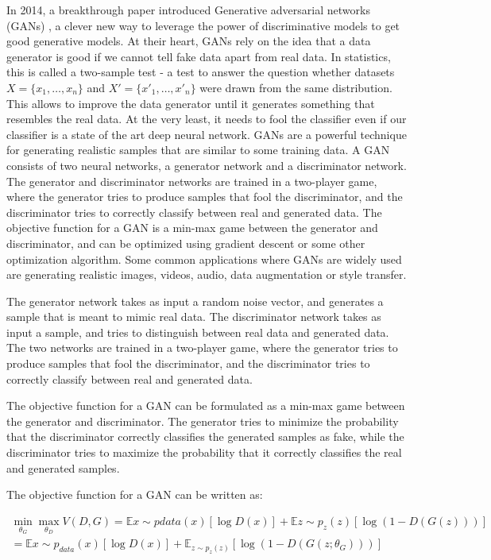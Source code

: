 In 2014, a breakthrough paper introduced Generative adversarial networks (GANs) \cite{goodfellow2020generative}, a clever new way to leverage the power of discriminative models to get good generative models. At their heart, GANs rely on the idea that a data generator is good if we cannot tell fake data apart from real data. In statistics, this is called a two-sample test - a test to answer the question whether datasets $X=\{x_1,\ldots, x_n\}$ and $X'=\{x'_1,\ldots, x'_n\}$ were drawn from the same distribution. This allows to improve the data generator until it generates something that resembles the real data. At the very least, it needs to fool the classifier even if our classifier is a state of the art deep neural network. GANs are a powerful technique for generating realistic samples that are similar to some training data. A GAN consists of two neural networks, a generator network and a discriminator network. The generator and discriminator networks are trained in a two-player game, where the generator tries to produce samples that fool the discriminator, and the discriminator tries to correctly classify between real and generated data. The objective function for a GAN is a min-max game between the generator and discriminator, and can be optimized using gradient descent or some other optimization algorithm. Some common applications where GANs are widely used are generating realistic images, videos, audio, data augmentation or style transfer.

The generator network takes as input a random noise vector, and generates a sample that is meant to mimic real data. The discriminator network takes as input a sample, and tries to distinguish between real data and generated data. The two networks are trained in a two-player game, where the generator tries to produce samples that fool the discriminator, and the discriminator tries to correctly classify between real and generated data.

The objective function for a GAN can be formulated as a min-max game between the generator and discriminator. The generator tries to minimize the probability that the discriminator correctly classifies the generated samples as fake, while the discriminator tries to maximize the probability that it correctly classifies the real and generated samples.

The objective function for a GAN can be written as:

\begin{equation}
\begin{split}
	\min_{\theta_G}\max_{\theta_D} V(D, G) = \mathbb{E}{x\sim p{data}(x)}[\log D(x)] + \mathbb{E}{z\sim p_z(z)}[\log(1-D(G(z)))] \\
	= \mathbb{E}{x\sim p_{data}(x)}[\log D(x)] + \mathbb{E}_{z\sim p_z(z)}[\log(1-D(G(z;\theta_G)))]
\end{split}
\end{equation}

